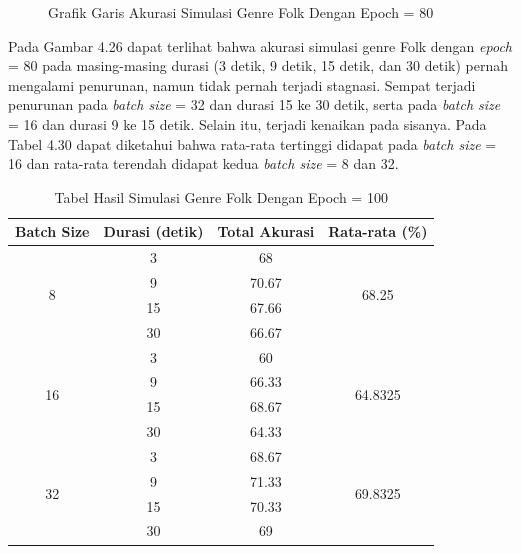 \begin{enumerate}
\begin{figure}[H]
			\caption{Grafik Garis Akurasi Simulasi Genre Folk Dengan Epoch = 80}
			\label{fig:folksumcharte80}
		\end{figure}
		
		Pada Gambar 4.26 dapat terlihat bahwa akurasi simulasi genre Folk dengan \emph{epoch} = 80 pada masing-masing durasi (3 detik, 9 detik, 15 detik, dan 30 detik) pernah mengalami penurunan, namun tidak pernah terjadi stagnasi. Sempat terjadi penurunan pada \emph{batch size} = 32 dan durasi 15 ke 30 detik, serta pada \emph{batch size} = 16 dan durasi 9 ke 15 detik. Selain itu, terjadi kenaikan pada sisanya. Pada Tabel 4.30 dapat diketahui bahwa rata-rata tertinggi didapat pada \emph{batch size} = 16 dan rata-rata terendah didapat kedua \emph{batch size} = 8 dan 32.
		
		\begin{longtable}[c]{|c|c|c|c|}
			\caption{Tabel Hasil Simulasi Genre Folk Dengan Epoch = 100}
			\label{tab:my-table}\\
			\hline
			\textbf{Batch Size} & \textbf{Durasi (detik)} & \textbf{Total Akurasi} & \textbf{Rata-rata (\%)}       \\ \hline
			\endfirsthead
			\endhead
			\multirow{4}{*}{8}  & 3                       & 68                     & \multirow{4}{*}{68.25}   \\ \cline{2-3}
			& 9                       & 70.67                  &                          \\ \cline{2-3}
			& 15                      & 67.66                  &                          \\ \cline{2-3}
			& 30                      & 66.67                  &                          \\ \hline
			\multirow{4}{*}{16} & 3                       & 60                     & \multirow{4}{*}{64.8325} \\ \cline{2-3}
			& 9                       & 66.33                  &                          \\ \cline{2-3}
			& 15                      & 68.67                  &                          \\ \cline{2-3}
			& 30                      & 64.33                  &                          \\ \hline
			\multirow{4}{*}{32} & 3                       & 68.67                  & \multirow{4}{*}{69.8325} \\ \cline{2-3}
			& 9                       & 71.33                  &                          \\ \cline{2-3}
			& 15                      & 70.33                  &                          \\ \cline{2-3}
			& 30                      & 69                     &                          \\ \hline
		\end{longtable}
		

\end{enumerate}
